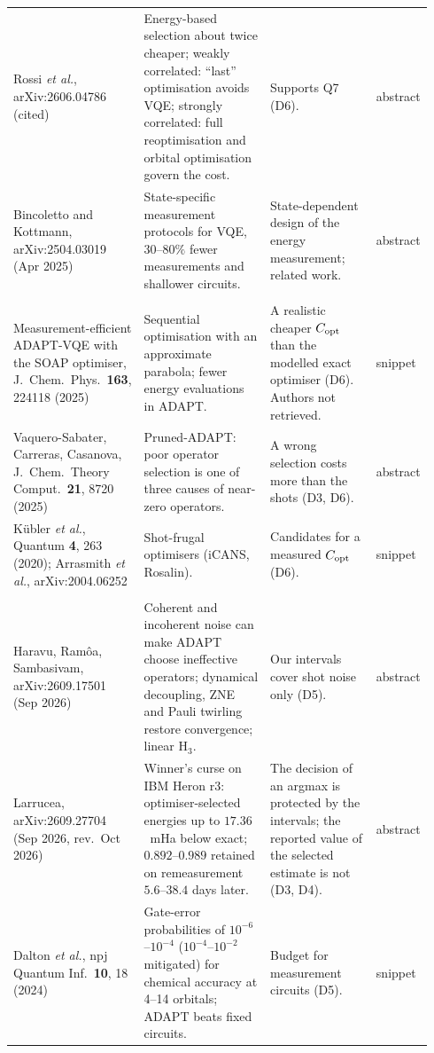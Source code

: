\documentclass[11pt]{article}
\begin{document}
\begin{longtable}{>{\raggedright\arraybackslash}p{0.27\linewidth}>{\raggedright\arraybackslash}p{0.33\linewidth}>{\raggedright\arraybackslash}p{0.27\linewidth}>{\raggedright\arraybackslash}p{0.07\linewidth}}
Rossi \emph{et al.}, arXiv:2606.04786 (cited) & Energy-based selection about twice cheaper; weakly correlated: ``last'' optimisation avoids VQE; strongly correlated: full reoptimisation and orbital optimisation govern the cost. & Supports Q7 (D6). & abstract \\
Bincoletto and Kottmann, arXiv:2504.03019 (Apr 2025) & State-specific measurement protocols for VQE, $30$--$80\%$ fewer measurements and shallower circuits. & State-dependent design of the energy measurement; related work. & abstract \\
\midrule
\multicolumn{4}{l}{\emph{Optimisation cost}} \\
Measurement-efficient ADAPT-VQE with the SOAP optimiser, J.\ Chem.\ Phys.\ \textbf{163}, 224118 (2025) & Sequential optimisation with an approximate parabola; fewer energy evaluations in ADAPT. & A realistic cheaper $C_{\rm opt}$ than the modelled exact optimiser (D6). Authors not retrieved. & snippet \\
Vaquero-Sabater, Carreras, Casanova, J.\ Chem.\ Theory Comput.\ \textbf{21}, 8720 (2025) & Pruned-ADAPT: poor operator selection is one of three causes of near-zero operators. & A wrong selection costs more than the shots (D3, D6). & abstract \\
K\"ubler \emph{et al.}, Quantum \textbf{4}, 263 (2020); Arrasmith \emph{et al.}, arXiv:2004.06252 & Shot-frugal optimisers (iCANS, Rosalin). & Candidates for a measured $C_{\rm opt}$ (D6). & snippet \\
\midrule
\multicolumn{4}{l}{\emph{Noise, bias, hardware}} \\
Haravu, Ram\^oa, Sambasivam, arXiv:2609.17501 (Sep 2026) & Coherent and incoherent noise can make ADAPT choose ineffective operators; dynamical decoupling, ZNE and Pauli twirling restore convergence; linear H$_3$. & Our intervals cover shot noise only (D5). & abstract \\
Larrucea, arXiv:2609.27704 (Sep 2026, rev.\ Oct 2026) & Winner's curse on IBM Heron r3: optimiser-selected energies up to $17.36$~mHa below exact; $0.892$--$0.989$ retained on remeasurement $5.6$--$38.4$ days later. & The decision of an argmax is protected by the intervals; the reported value of the selected estimate is not (D3, D4). & abstract \\
Dalton \emph{et al.}, npj Quantum Inf.\ \textbf{10}, 18 (2024) & Gate-error probabilities of $10^{-6}$--$10^{-4}$ ($10^{-4}$--$10^{-2}$ mitigated) for chemical accuracy at 4--14 orbitals; ADAPT beats fixed circuits. & Budget for measurement circuits (D5). & snippet \\

\end{longtable}
\end{document}
